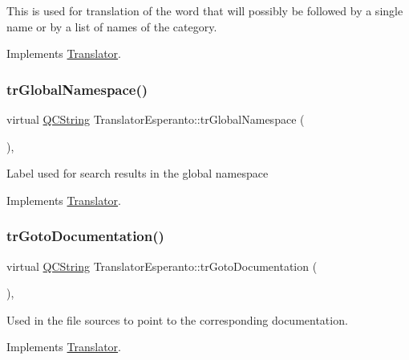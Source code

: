This is used for translation of the word that will possibly be followed by a single name or by a list of names of the category. 

Implements \mbox{\hyperlink{class_translator}{Translator}}.

\mbox{\label{class_translator_esperanto_a1db5c2fce7468f05a5ead5d306992a85}} 
\subsubsection{\texorpdfstring{trGlobalNamespace()}{trGlobalNamespace()}}
{\footnotesize\ttfamily virtual \mbox{\hyperlink{class_q_c_string}{Q\+C\+String}} Translator\+Esperanto\+::tr\+Global\+Namespace (\begin{DoxyParamCaption}{ }\end{DoxyParamCaption})\hspace{0.3cm}{\ttfamily [inline]}, {\ttfamily [virtual]}}

Label used for search results in the global namespace 

Implements \mbox{\hyperlink{class_translator}{Translator}}.

\mbox{\label{class_translator_esperanto_ae48ffbd0ef53537a198afcb648200669}} 
\subsubsection{\texorpdfstring{trGotoDocumentation()}{trGotoDocumentation()}}
{\footnotesize\ttfamily virtual \mbox{\hyperlink{class_q_c_string}{Q\+C\+String}} Translator\+Esperanto\+::tr\+Goto\+Documentation (\begin{DoxyParamCaption}{ }\end{DoxyParamCaption})\hspace{0.3cm}{\ttfamily [inline]}, {\ttfamily [virtual]}}

Used in the file sources to point to the corresponding documentation. 

Implements \mbox{\hyperlink{class_translator}{Translator}}.

